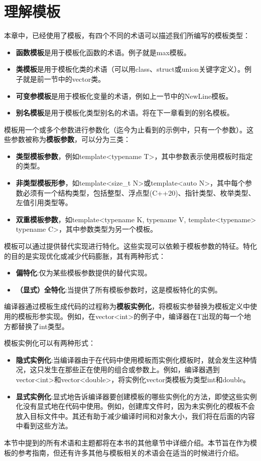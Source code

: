 \section{理解模板}
本章中，已经使用了模板，有四个不同的术语可以描述我们所编写的模板类型：

\begin{itemize}
  \item \textbf{函数模板}是用于模板化函数的术语。例子就是max模板。
  \item \textbf{类模板}是用于模板化类的术语（可以用class、struct或union关键字定义）。例子就是前一节中的vector类。
  \item \textbf{可变参模板}是用于模板化变量的术语，例如上一节中的NewLine模板。
  \item \textbf{别名模板}是用于模板化类型别名的术语。将在下一章看到的别名模板。
\end{itemize}

模板用一个或多个参数进行参数化（迄今为止看到的示例中，只有一个参数）。这些参数被称为\textbf{模板参数}，可以分为三类：

\begin{itemize}
  \item \textbf{类型模板参数}，例如template<typename T>，其中参数表示使用模板时指定的类型。
  \item \textbf{非类型模板形参}，如template<size_t N>或template<auto N>，其中每个参数必须有一个结构类型，包括整型、浮点型(C++20)、指针类型、枚举类型、左值引用类型等。
  \item \textbf{双重模板参数}，如template<typename K, typename V, template<typename> typename C>，其中参数类型为另一个模板。
\end{itemize}

模板可以通过提供替代实现进行特化。这些实现可以依赖于模板参数的特征。特化的目的是实现优化或减少代码膨胀，其有两种形式：

\begin{itemize}
  \item \textbf{偏特化}:仅为某些模板参数提供的替代实现。
  \item \textbf{（显式）全特化}:当提供了所有模板参数时，这是模板特化的实例。
\end{itemize}

编译器通过模板生成代码的过程称为\textbf{模板实例化}，将模板实参替换为模板定义中使用的模板形参实现。例如，在vector<int>的例子中，编译器在T出现的每一个地方都替换了int类型。

模板实例化可以有两种形式：

\begin{itemize}
  \item \textbf{隐式实例化}:当编译器由于在代码中使用模板而实例化模板时，就会发生这种情况，这只发生在那些正在使用的组合或参数上。例如，编译器遇到vector<int>和vector<double>，将实例化vector类模板为类型int和double。
  \item \textbf{显式实例化}:显式地告诉编译器要创建模板的哪些实例化的方法，即使这些实例化没有显式地在代码中使用。例如，创建库文件时，因为未实例化的模板不会放入目标文件中。其还有助于减少编译时间和对象大小，我们将在后面的内容中看到这些方法。
\end{itemize}

本节中提到的所有术语和主题都将在本书的其他章节中详细介绍。本节旨在作为模板的参考指南，但还有许多其他与模板相关的术语会在适当的时候进行介绍。



